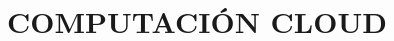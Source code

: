 \documentclass[a4paper, 12pt]{report}
\begin{document}
\singlespacing
\renewcommand{\contentsname}{\centering\bf{\large{{\'INDICE GENERAL}}}}
\renewcommand{\listfigurename}{\centering\bf{\large{{LISTA DE FIGURAS}}}}
\renewcommand{\listtablename}{\centering\bf{\large{{LISTA DE TABLAS}}}}

\tableofcontents    %
\listoffigures      %
\listoftables       %

\doublespacing
\vspace*{5em}

\chapter{COMPUTACI\'ON CLOUD}\label{cap1}
\pagestyle{plain}
\vspace*{-2em}
\begin{justify}
\end{justify}
\end{document}
